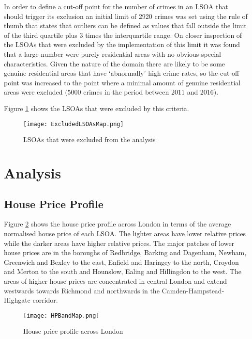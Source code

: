 \documentclass{article}
\begin{document}
In order to define a cut-off point for the number of crimes in an LSOA that should trigger its exclusion an initial limit of 2920 crimes was set using the rule of thumb that states that outliers can be defined as values that fall outside the limit of the third quartile plus 3 times the interquartile range. On closer inspection of the LSOAs that were excluded by the implementation of this limit it was found that a large number were purely residential areas with no obvious special characteristics. Given the nature of the domain there are likely to be some genuine residential areas that have ‘abnormally’ high crime rates, so the cut-off point was increased to the point where a minimal amount of genuine residential areas were excluded (5000 crimes in the period between 2011 and 2016).
\newline

Figure \ref{fig:ExcludedLSOAsMap} shows the LSOAs that were excluded by this criteria.

\begin{figure}[H]
  \texttt{[image: ExcludedLSOAsMap.png]}
  \caption{LSOAs that were excluded from the analysis}
  \label{fig:ExcludedLSOAsMap}
\end{figure}
\bigskip

\newpage
\section{Analysis} \label{Analysis}

\subsection{House Price Profile}

Figure \ref{fig:HPBandMap} shows the house price profile across London in terms of the average normalised house price of each LSOA. The lighter areas have lower relative prices while the darker areas have higher relative prices. The major patches of lower house prices are in the boroughs of Redbridge, Barking and Dagenham, Newham, Greenwich and Bexley to the east, Enfield and Haringey to the north, Croydon and Merton to the south and Hounslow, Ealing and Hillingdon to the west. The areas of higher house prices are concentrated in central London and extend westwards towards Richmond and northwards in the Camden-Hampstead-Highgate corridor.


\begin{figure}[H]
\begin{center}
  \texttt{[image: HPBandMap.png]}
  \caption{House price profile across London}
  \label{fig:HPBandMap}
\end{center}
\end{figure}
\bigskip
\end{document}
